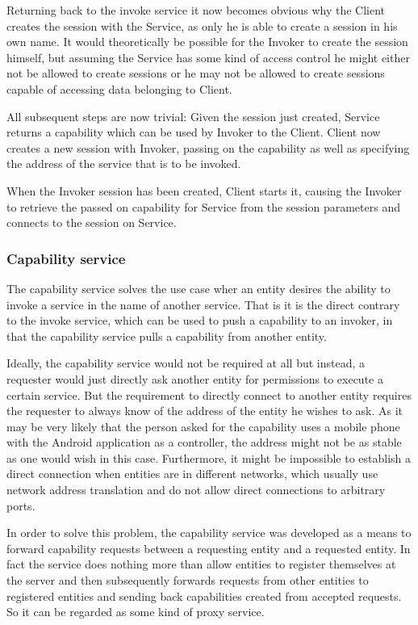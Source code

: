 Returning back to the invoke service it now becomes obvious why the Client creates the session with the Service, as only he is able to create a session in his own name.
It would theoretically be possible for the Invoker to create the session himself, but assuming the Service has some kind of access control he might either not be allowed to create sessions or he may not be allowed to create sessions capable of accessing data belonging to Client.

All subsequent steps are now trivial:
Given the session just created, Service returns a capability which can be used by Invoker to the Client.
Client now creates a new session with Invoker, passing on the capability as well as specifying the address of the service that is to be invoked.

When the Invoker session has been created, Client starts it, causing the Invoker to retrieve the passed on capability for Service from the session parameters and connects to the session on Service.

\subsubsection{Capability service}
\label{sec:capability-service}

The capability service solves the use case wher an entity desires the ability to invoke a service in the name of another service.
That is it is the direct contrary to the invoke service, which can be used to push a capability to an invoker, in that the capability service pulls a capability from another entity.

Ideally, the capability service would not be required at all but instead, a requester would just directly ask another entity for permissions to execute a certain service.
But the requirement to directly connect to another entity requires the requester to always know of the address of the entity he wishes to ask.
As it may be very likely that the person asked for the capability uses a mobile phone with the Android application as a controller, the address might not be as stable as one would wish in this case.
Furthermore, it might be impossible to establish a direct connection when entities are in different networks, which usually use network address translation and do not allow direct connections to arbitrary ports.

In order to solve this problem, the capability service was developed as a means to forward capability requests between a requesting entity and a requested entity.
In fact the service does nothing more than allow entities to register themselves at the server and then subsequently forwards requests from other entities to registered entities and sending back capabilities created from accepted requests.
So it can be regarded as some kind of proxy service.

